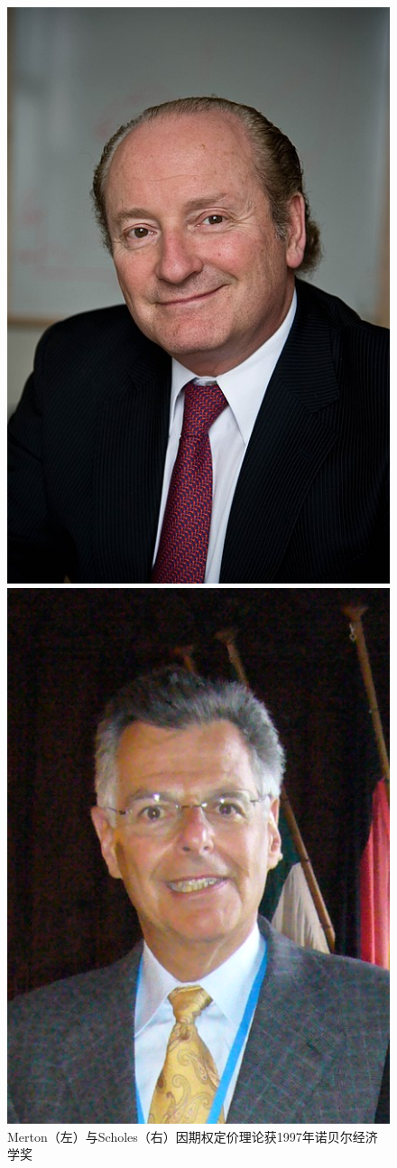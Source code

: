     \begin{figure}[H]
        \centering
        \begin{minipage}{0.48\linewidth}
            \centering
            \includegraphics[width=0.4\linewidth]{img/Merton.jpg}
        \end{minipage}
        \begin{minipage}{0.48\linewidth}
            \centering
            \includegraphics[width=0.4\linewidth]{img/Scholes.png}
        \end{minipage}
        \caption{Merton（左）与Scholes（右）因期权定价理论获1997年诺贝尔经济学奖}
    \end{figure}

